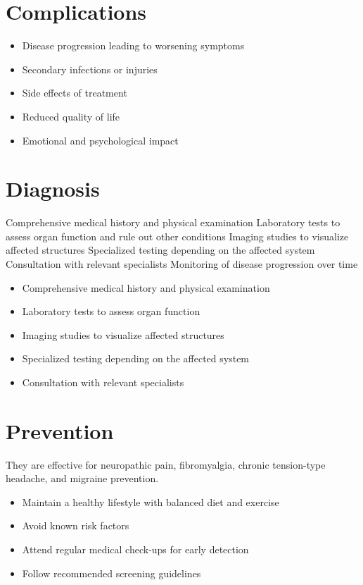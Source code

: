 \section{Complications}
\begin{itemize}[noitemsep]
  \item Disease progression leading to worsening symptoms
  \item Secondary infections or injuries
  \item Side effects of treatment
  \item Reduced quality of life
  \item Emotional and psychological impact
\end{itemize}
\section{Diagnosis}
Comprehensive medical history and physical examination Laboratory tests to assess organ function and rule out other conditions Imaging studies to visualize affected structures Specialized testing depending on the affected system Consultation with relevant specialists Monitoring of disease progression over time

\begin{itemize}[noitemsep]
  \item Comprehensive medical history and physical examination
  \item Laboratory tests to assess organ function
  \item Imaging studies to visualize affected structures
  \item Specialized testing depending on the affected system
  \item Consultation with relevant specialists
\end{itemize}
\section{Prevention}
They are effective for neuropathic pain, fibromyalgia, chronic tension-type headache, and migraine prevention.

\begin{itemize}[noitemsep]
  \item Maintain a healthy lifestyle with balanced diet and exercise
  \item Avoid known risk factors
  \item Attend regular medical check-ups for early detection
  \item Follow recommended screening guidelines
\end{itemize}
